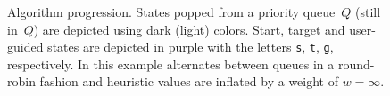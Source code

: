 \documentclass{article}
\begin{document}
\begin{figure}[t]%
  \centering%
	\vspace{-3mm}
  \caption{%
    Algorithm progression.
    States popped from a priority queue~$Q$ (still in~$Q$) are depicted using dark (light) colors.
    Start, target and user-guided states are depicted in purple with the letters \texttt{s}, \texttt{t}, \texttt{g}, respectively. 
    In this example \mhastar alternates between queues in a round-robin fashion and heuristic values are inflated by a weight of $w=\infty$.
}
\end{figure}
\end{document}
